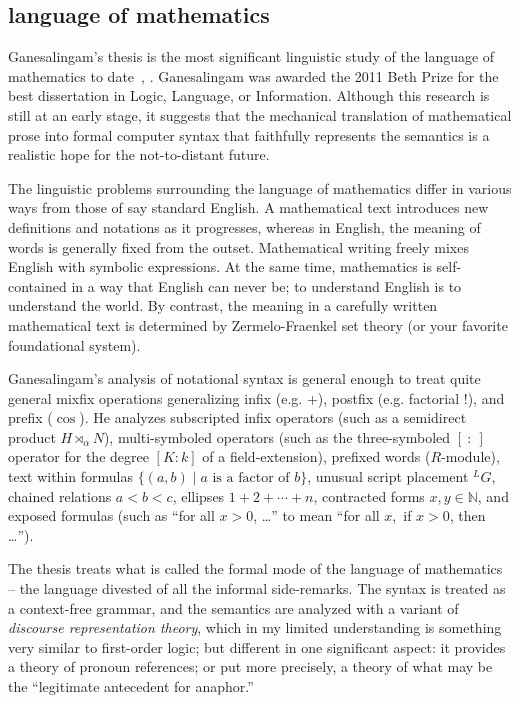 \documentclass{llncs}
\newcommand{\ring}[1]{\mathbb{#1}}
\begin{document}
\subsection{language of mathematics}


Ganesalingam's thesis is the most significant linguistic study of the
language of mathematics to date~\cite{Gan09}, \cite{Gan10}.
Ganesalingam was awarded the 2011 Beth Prize for the best dissertation
in Logic, Language, or Information.  Although this research is still
at an early stage, it suggests that the mechanical translation of
mathematical prose into formal computer syntax that faithfully
represents the semantics is a realistic hope for the not-to-distant
future.  


The linguistic problems surrounding the language of mathematics differ
in various ways from those of say standard English.  A mathematical
text introduces new definitions and notations as it progresses,
whereas in English, the meaning of words is generally fixed from the
outset.  Mathematical writing freely mixes English with symbolic
expressions.  At the same time, mathematics is self-contained in a way
that English can never be; to understand English is to understand the
world.  By contrast, the meaning in a carefully written mathematical
text is determined by Zermelo-Fraenkel set theory (or your favorite
foundational system).

Ganesalingam's analysis of notational syntax is general enough to
treat quite general mixfix operations generalizing infix (e.g. +),
postfix (e.g. factorial !), and prefix ($\cos$).  He analyzes
subscripted infix operators (such as a semidirect product
$H\rtimes_\alpha N$), multi-symboled operators (such as the
three-symboled $[~:~]$ operator for the degree $[K:k]$ of a
field-extension), prefixed words ($R$-module), text within formulas
$\{(a,b) \mid a \text{~is a factor of~} b\}$, unusual script placement
${}^LG$, chained relations $a<b<c$, ellipses $1+2+\cdots+n$,
contracted forms $x,y\in\ring{N}$, and exposed formulas (such as ``for
all $x>0$, \dots'' to mean ``for all $x$,~if $x>0$, then \dots'').

The thesis treats what is called the formal mode of the language of
mathematics -- the language divested of all the informal side-remarks.
The syntax is treated as a context-free grammar, and the semantics are
analyzed with a variant of {\it discourse representation theory},
which in my limited understanding is something very similar to
first-order logic; but different in one significant aspect: it
provides a theory of pronoun references; or put more precisely, a
theory of what may be the ``legitimate antecedent for anaphor.''
\end{document}
